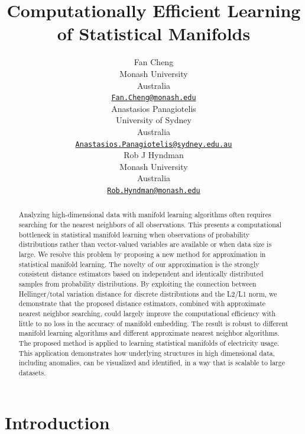 \documentclass{article}
\title{Computationally Efficient Learning of Statistical Manifolds}
\author{
    Fan Cheng
   \\
    Monash University \\
  Australia \\
  \texttt{\href{mailto:Fan.Cheng@monash.edu}{\nolinkurl{Fan.Cheng@monash.edu}}} \\
   \And
    Anastasios Panagiotelis
   \\
    University of Sydney \\
  Australia \\
  \texttt{\href{mailto:Anastasios.Panagiotelis@sydney.edu.au}{\nolinkurl{Anastasios.Panagiotelis@sydney.edu.au}}} \\
   \And
    Rob J Hyndman
   \\
    Monash University \\
  Australia \\
  \texttt{\href{mailto:Rob.Hyndman@monash.edu}{\nolinkurl{Rob.Hyndman@monash.edu}}} \\
  }
\begin{document}
\maketitle


\begin{abstract}
Analyzing high-dimensional data with manifold learning algorithms often
requires searching for the nearest neighbors of all observations. This
presents a computational bottleneck in statistical manifold learning
when observations of probability distributions rather than vector-valued
variables are available or when data size is large. We resolve this
problem by proposing a new method for approximation in statistical
manifold learning. The novelty of our approximation is the strongly
consistent distance estimators based on independent and identically
distributed samples from probability distributions. By exploiting the
connection between Hellinger/total variation distance for discrete
distributions and the L2/L1 norm, we demonstrate that the proposed
distance estimators, combined with approximate nearest neighbor
searching, could largely improve the computational efficiency with
little to no loss in the accuracy of manifold embedding. The result is
robust to different manifold learning algorithms and different
approximate nearest neighbor algorithms. The proposed method is applied
to learning statistical manifolds of electricity usage. This application
demonstrates how underlying structures in high dimensional data,
including anomalies, can be visualized and identified, in a way that is
scalable to large datasets.
\end{abstract}



\newpage

\hypertarget{introduction}{%
\section{Introduction}\label{introduction}}
\end{document}
